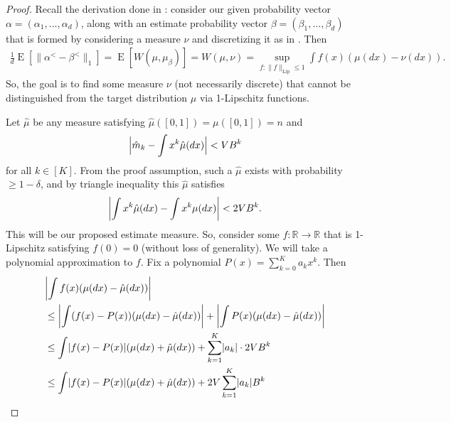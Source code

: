 \documentclass{article}
\theoremstyle{definition}
\DeclareMathOperator{\E}{E}
\DeclarePairedDelimiter{\abs}{\lvert}{\rvert}
\begin{document}
\begin{proof}
Recall the derivation done in \cite{hjw18}: consider our given probability vector $\alpha = (\alpha_1,\ldots,\alpha_d)$, along with an estimate probability vector $\beta = (\beta_1,\ldots,\beta_d)$ that is formed by considering a measure $\nu$ and discretizing it as in \cite[Definition~8]{hjw18}.
Then
\begin{align*}
    \frac1d\E[\|\alpha^< - \beta^<\|_1] = \E[W(\mu, \mu_\beta)] = W(\mu, \nu) = \sup_{f : \|f\|_{\mathrm{Lip}} \leq 1} \int f(x)(\mu(dx) - \nu(dx)).
\end{align*}
So, the goal is to find some measure $\nu$ (not necessarily discrete) that cannot be distinguished from the target distribution $\mu$ via 1-Lipschitz functions.

Let $\hat{\mu}$ be any measure satisfying $\hat{\mu}([0,1]) = \mu([0,1]) = n$ and
\begin{align*}
    \abs[\Big]{\hat{m}_k - \int  x^k \hat{\mu}(dx)} < VB^k
\end{align*}
for all $k \in [K]$.
From the proof assumption, such a $\hat{\mu}$ exists with probability $\geq 1-\delta$, and by triangle inequality this $\hat{\mu}$ satisfies
\begin{equation} \label{eqn:moments-good}
    \abs*{\int x^k\hat{\mu}(dx) - \int x^k \mu(dx)} < 2VB^k.
\end{equation}
This will be our proposed estimate measure.
So, consider some $f: \mathbb{R} \to \mathbb{R}$ that is 1-Lipschitz satisfying $f(0) = 0$ (without loss of generality).
We will take a polynomial approximation to $f$.
Fix a polynomial $P(x) = \sum_{k=0}^K a_kx^k$.
Then
\begin{align*}
    &\abs*{\int f(x)(\mu(dx) - \hat{\mu}(dx))} \\
    & \leq \abs*{\int (f(x) - P(x))(\mu(dx) - \hat{\mu}(dx))} + \abs*{\int P(x)(\mu(dx) - \hat{\mu}(dx))} \\
    & \leq \int \abs{f(x) - P(x)}(\mu(dx) + \hat{\mu}(dx)) + \sum_{k=1}^K \abs{a_k}\cdot 2 VB^k \\
    & \leq \int \abs{f(x) - P(x)}(\mu(dx) + \hat{\mu}(dx)) + 2V \sum_{k=1}^K \abs{a_k}B^k
\end{align*}


\end{proof}
\end{document}
